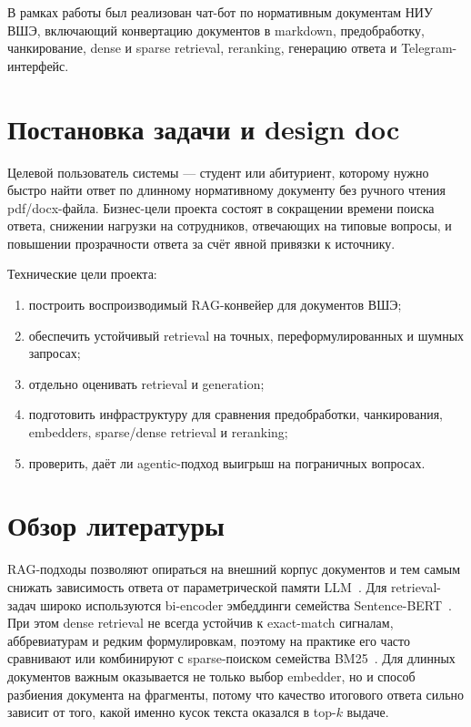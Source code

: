 \documentclass[12pt,a4paper]{article}
\begin{document}
В рамках работы был реализован чат-бот по нормативным документам НИУ ВШЭ, включающий конвертацию документов в markdown, предобработку, чанкирование, dense и sparse retrieval, reranking, генерацию ответа и Telegram-интерфейс.

\section{Постановка задачи и design doc}

Целевой пользователь системы --- студент или абитуриент, которому нужно быстро найти ответ по длинному нормативному документу без ручного чтения pdf/docx-файла. Бизнес-цели проекта состоят в сокращении времени поиска ответа, снижении нагрузки на сотрудников, отвечающих на типовые вопросы, и повышении прозрачности ответа за счёт явной привязки к источнику.

Технические цели проекта:
\begin{enumerate}
    \item построить воспроизводимый RAG-конвейер для документов ВШЭ;
    \item обеспечить устойчивый retrieval на точных, переформулированных и шумных запросах;
    \item отдельно оценивать retrieval и generation;
    \item подготовить инфраструктуру для сравнения предобработки, чанкирования, embedders, sparse/dense retrieval и reranking;
    \item проверить, даёт ли agentic-подход выигрыш на пограничных вопросах.
\end{enumerate}

\section{Обзор литературы}

RAG-подходы позволяют опираться на внешний корпус документов и тем самым снижать зависимость ответа от параметрической памяти LLM~\cite{lewis2020rag}. Для retrieval-задач широко используются bi-encoder эмбеддинги семейства Sentence-BERT~\cite{reimers2019sentencebert}. При этом dense retrieval не всегда устойчив к exact-match сигналам, аббревиатурам и редким формулировкам, поэтому на практике его часто сравнивают или комбинируют с sparse-поиском семейства BM25~\cite{robertson1994bm25}. Для длинных документов важным оказывается не только выбор embedder, но и способ разбиения документа на фрагменты, потому что качество итогового ответа сильно зависит от того, какой именно кусок текста оказался в top-$k$ выдаче.
\end{document}
